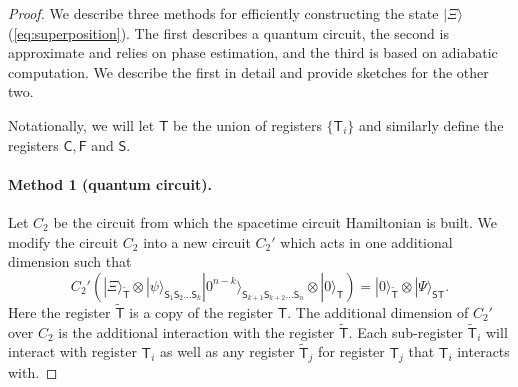 \documentclass[11pt,letterpaper]{article}
\theoremstyle{definition}
\theoremstyle{remark}
\numberwithin{equation}{section}
\let\origparagraph\paragraph
\renewcommand{\paragraph}[1]{\origparagraph{#1.}}
\theoremstyle{definition}
\newcommand{\ket}[1]{|#1\rangle}
\newcommand{\sC}{{\mathsf{C}}}
\newcommand{\sF}{{\mathsf{F}}}
\newcommand{\sS}{{\mathsf{S}}}
\newcommand{\sT}{{\mathsf{T}}}
\begin{document}
\begin{proof}
We describe three methods for efficiently constructing the state $\ket{\Xi}$ (\ref{eq:superposition}). The first describes a quantum circuit, the second is approximate and relies on phase estimation, and the third is based on adiabatic computation. We describe the first in detail and provide sketches for the other two.

Notationally, we will let $\sT$ be the union of registers $\{\sT_i\}$ and similarly define the registers $\sC, \sF$ and $\sS$.

\paragraph{Method 1 (quantum circuit)}
Let $C_2$ be the circuit from which the spacetime circuit Hamiltonian is built. We modify the circuit $C_2$ into a new circuit $C_2'$ which acts in one additional dimension such that
\begin{equation}
C_2' \left( \ket{\Xi}_{\widetilde{\sT}} \otimes \ket{\psi}_{\sS_1 \sS_2 \ldots \sS_k} \ket{0^{n-k}}_{\sS_{k+1} \sS_{k+2} \ldots \sS_n} \otimes \ket{0}_{\sT} \right) = \ket{0}_{\widetilde{\sT}} \otimes \ket{\Psi}_{\sS\sT}.
\end{equation}
Here the register $\widetilde{\sT}$ is a copy of the register $\sT$. The additional dimension of $C_2'$ over $C_2$ is the additional interaction with the register $\widetilde{\sT}$. Each sub-register $\widetilde{\sT}_i$ will interact with register $\sT_i$ as well as any register $\widetilde{\sT}_j$ for register $\sT_j$ that $\sT_i$ interacts with.


\end{proof}
\end{document}
